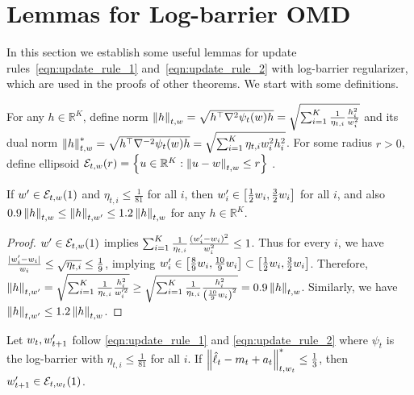 \section{Lemmas for Log-barrier OMD}
\label{section:all_kinds_of_lemmas}

In this section we establish some useful lemmas for update rules~\eqref{eqn:update_rule_1} and~\eqref{eqn:update_rule_2} with log-barrier regularizer,
which are used in the proofs of other theorems.
We start with some definitions.

\begin{definition}
\label{definition:norm}
For any $h \in \mathbb{R}^K$, define norm $\left\lVert h\right\rVert_{t,w}=\sqrt{h^\top \nabla^2 \psi_t(w) h}=\sqrt{\sum_{i=1}^K \frac{1}{\eta_{t,i}}\frac{h_i^2}{w_i^2}}$ and its dual norm $\left\lVert h\right\rVert_{t,w}^*=\sqrt{h^\top \nabla^{-2} \psi_t(w) h}=\sqrt{\sum_{i=1}^K \eta_{t,i}w_i^2 h_i^2}$.
For some radius $r > 0$, define ellipsoid $\mathcal{E}_{t,w}(r)=\left\{u \in \mathbb{R}^K : \left\lVert u-w\right\rVert_{t,w}\leq r \right\}$ . 
\end{definition}

\begin{lemma}
\label{lemma:norm_close}
If $w^\prime \in \mathcal{E}_{t,w}(1)$ and $\eta_{t,i}\leq \frac{1}{81}$ for all $i$, then $w_i^\prime\in \left[ \frac{1}{2}w_i, \frac{3}{2}w_i \right]$ for all $i$, and also $ 0.9\left\lVert h\right\rVert_{t,w} \leq \left\lVert h\right\rVert_{t,w^\prime} \leq 1.2\left\lVert h\right\rVert_{t,w}$ for any $h\in \mathbb{R}^K$. 
\end{lemma}
\begin{proof}
$w^\prime\in \mathcal{E}_{t,w}(1)$ implies $\sum_{i=1}^K \frac{1}{\eta_{t,i}}\frac{(w^\prime_i-w_i)^2}{w_i^2}\leq 1$. Thus for every $i$, we have $\frac{\lvert {w_i^\prime-w_i} \rvert}{w_i}\leq \sqrt{\eta_{t,i}}\leq \frac{1}{9}$, implying $w_i^\prime\in \left[ \frac{8}{9}w_i, \frac{10}{9}w_i \right]\subset\left[ \frac{1}{2}w_i, \frac{3}{2}w_i \right]$. 
Therefore, $\left\lVert h\right\rVert_{t,w^\prime}
=\sqrt{\sum_{i=1}^K \frac{1}{\eta_{t,i}} \frac{h_i^2}{w^{\prime 2}_i}}
\geq \sqrt{\sum_{i=1}^K \frac{1}{\eta_{t,i}}\frac{h_i^2}{\left(\frac{10}{9}w_i\right)^2}}
=0.9\left\lVert h\right\rVert_{t,w}$. 
Similarly, we have $\left\lVert h\right\rVert_{t,w^\prime}\leq 1.2\left\lVert h\right\rVert_{t,w}$. 
\end{proof}

\begin{lemma}
\label{lemma:stability}
Let $w_t, w_{t+1}^\prime$ follow \eqref{eqn:update_rule_1} and \eqref{eqn:update_rule_2} where $\psi_t$ is the log-barrier with $\eta_{t,i}\leq \frac{1}{81}$ for all $i$. If $\left\lVert\hat{\ell}_t-m_t+a_t\right\rVert^*_{t,w_t}\leq \frac{1}{3}$, then $w_{t+1}^\prime \in \mathcal{E}_{t,w_t}(1)$. 
\end{lemma}

